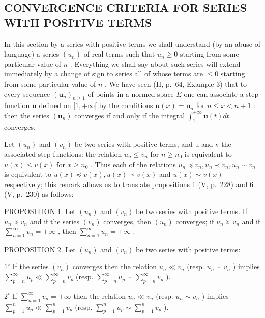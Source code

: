 \subsection{CONVERGENCE CRITERIA FOR SERIES WITH POSITIVE TERMS}

In this section by a series with positive terms we shall understand (by an abuse of language) a series \((u_{n})\) of real terms such that \(u_{n} \geqslant 0\) starting from some particular value of \(n\) . Everything we shall say about such series will extend immediately by a change of sign to series all of whose terms are \(\leqslant 0\) starting from some particular value of \(n\) . We have seen (II, p.~64, Example 3) that to every sequence \((\mathbf{u}_n)_{n\geqslant 1}\) of points in a normed space \(E\) one can associate a step function \(\mathbf{u}\) defined on \([1, +\infty[\) by the conditions \(\mathbf{u}(x) = \mathbf{u}_n\) for \(n\leqslant x < n + 1\) : then the series \((\mathbf{u}_n)\) converges if and only if the integral \(\int_1^{+\infty}\mathbf{u}(t)dt\) converges.

Let \((u_{n})\) and \((v_{n})\) be two series with positive terms, and u and v the associated step functions: the relation \(u_{n} \leqslant v_{n}\) for \(n \geqslant n_{0}\) is equivalent to \(u(x) \leqslant v(x)\) for \(x \geqslant n_{0}\) . Thus each of the relations \(u_{n} \preccurlyeq v_{n}, u_{n} \prec v_{n}, u_{n} \sim v_{n}\) is equivalent to \(u(x) \preccurlyeq v(x), u(x) \prec v(x)\) and \(u(x) \sim v(x)\) respectively; this remark allows us to translate propositions 1 (V, p.~228) and 6 (V, p.~230) as follows:

PROPOSITION 1. Let \((u_{n})\) and \((v_{n})\) be two series with positive terms. If \(u_{n} \preccurlyeq v_{n}\) and if the series \((v_{n})\) converges, then \((u_{n})\) converges; if \(u_{n} \succcurlyeq v_{n}\) and if \(\sum_{n=1}^{\infty} v_{n} = +\infty\) , then \(\sum_{n=1}^{\infty} u_{n} = +\infty\) .

PROPOSITION 2. Let \((u_{n})\) and \((v_{n})\) be two series with positive terms:

\(1^{\circ}\) If the series \((v_{n})\) converges then the relation \(u_{n} \ll v_{n}\) (resp. \(u_{n} \sim v_{n}\) ) implies \(\sum_{p=n}^{\infty} u_{p} \ll \sum_{p=n}^{\infty} v_{p}\) (resp. \(\sum_{p=n}^{\infty} u_{p} \sim \sum_{p=n}^{\infty} v_{p}\) ).

\(2^{\circ}\) If \(\sum_{n=1}^{\infty} v_n = +\infty\) then the relation \(u_n \ll v_n\) (resp. \(u_n \sim v_n\) ) implies \(\sum_{p=1}^{n} u_p \ll \sum_{p=1}^{n} v_p\) (resp. \(\sum_{p=1}^{n} u_p \sim \sum_{p=1}^{n} v_p\) ).

